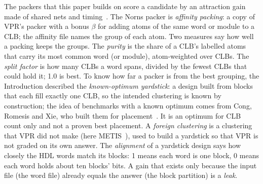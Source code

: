 The packers that this paper builds on score a candidate by an attraction gain made of shared nets and timing~\cite{marquardt99cluster,luu2011packing}. The Norns packer is \emph{affinity packing}: a copy of VPR's packer with a bonus $\beta$ for adding atoms of the same word or module to a CLB; the affinity file names the group of each atom. %
Two measures say how well a packing keeps the groups. The \emph{purity} is the share of a CLB's labelled atoms that carry its most common word (or module), atom-weighted over CLBs. %
The \emph{split factor} is how many CLBs a word spans, divided by the fewest CLBs that could hold it; 1.0 is best. %
To know how far a packer is from the best grouping, the Introduction described the \emph{known-optimum yardstick}: a design built from blocks that each fill exactly one CLB, so the intended clustering is known by construction; the idea of benchmarks with a known optimum comes from Cong, Romesis and Xie, who built them for placement~\cite{Cong03tpeko}. %
It is an optimum for CLB count only and not a proven best placement. A \emph{foreign clustering} is a clustering that VPR did not make (here METIS~\cite{karypis99partition}), used to build a yardstick so that VPR is not graded on its own answer. %
The \emph{alignment} of a yardstick design says how closely the HDL words match its blocks: 1 means each word is one block, 0 means each word holds about ten blocks' bits. %
A gain that exists only because the input file (the word file) already equals the answer (the block partition) is a \emph{leak}. %

